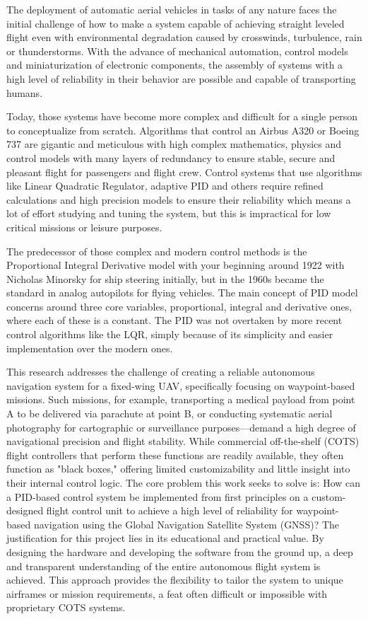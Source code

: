  The deployment of automatic aerial vehicles in tasks of any nature faces the initial challenge of how to make a system capable of achieving straight leveled flight even with environmental degradation caused by crosswinds, turbulence, rain or thunderstorms. With the advance of mechanical automation, control models and miniaturization of electronic components, the assembly of systems with a high level of reliability in their behavior are possible and capable of transporting humans.

 Today, those systems have become more complex and difficult for a single person to conceptualize from scratch. Algorithms that control an Airbus A320 or Boeing 737 are gigantic and meticulous with high complex mathematics, physics and control models with many layers of redundancy to ensure stable, secure and pleasant flight for passengers and flight crew. Control systems that use algorithms like Linear Quadratic Regulator, adaptive PID and others require refined calculations and high precision models to ensure their reliability which means a lot of effort studying and tuning the system, but this is impractical for low critical missions or leisure purposes.

 The predecessor of those complex and modern control methods is the Proportional Integral Derivative model with your beginning around 1922 with Nicholas Minorsky for ship steering initially, but in the 1960s became the standard in analog autopilots for flying vehicles. The main concept of PID model concerns around three core variables, proportional, integral and derivative ones, where each of these is a constant. The PID was not overtaken by more recent control algorithms like the LQR, simply because of its simplicity and easier implementation over the modern ones.

This research addresses the challenge of creating a reliable autonomous navigation system for a fixed-wing UAV, specifically focusing on waypoint-based missions. Such missions, for example, transporting a medical payload from point A to be delivered via parachute at point B, or conducting systematic aerial photography for cartographic or surveillance purposes—demand a high degree of navigational precision and flight stability. While commercial off-the-shelf (COTS) flight controllers that perform these functions are readily available, they often function as "black boxes," offering limited customizability and little insight into their internal control logic.  
The core problem this work seeks to solve is: How can a PID-based control system be implemented from first principles on a custom-designed flight control unit to achieve a high level of reliability for waypoint-based navigation using the Global Navigation Satellite System (GNSS)?
The justification for this project lies in its educational and practical value. By designing the hardware and developing the software from the ground up, a deep and transparent understanding of the entire autonomous flight system is achieved. This approach provides the flexibility to tailor the system to unique airframes or mission requirements, a feat often difficult or impossible with proprietary COTS systems.

